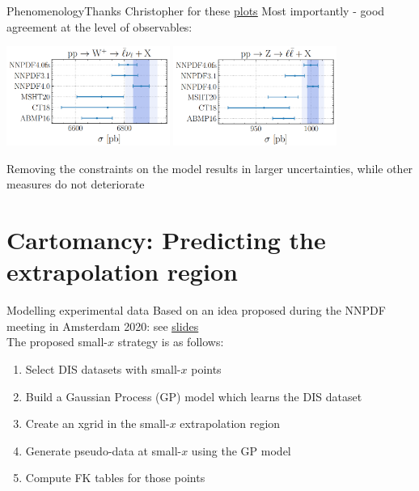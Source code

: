 \documentclass[aspectratio=169,11pt]{beamer}
\newcommand{\nn}{\vspace*{1em}}
\begin{document}
\begin{frame}[t]{Phenomenology}{Thanks Christopher for these {\color{blue} \underline{\href{https://vp.nnpdf.science/de96i8VBQ9Gc-zxl75AMfw==/pheno_featurescaling.pdf}{plots}}}}
  Most importantly - good agreement at the level of observables:
  \begin{center}
    \includegraphics[width=0.4\textwidth]{figures/pheno_w.png} \hfill
    \includegraphics[width=0.4\textwidth]{figures/pheno_z.png}
  \end{center}
  Removing the constraints on the model results in larger uncertainties, while other measures do not deteriorate
\end{frame}



\section{Cartomancy: Predicting the extrapolation region}


\begin{frame}[t]{Modelling experimental data}
  Based on an idea proposed during the NNPDF meeting in Amsterdam 2020: see 
  {\color{blue} \underline{\href{https://www.wiki.ed.ac.uk/download/attachments/432523942/carrazza.pdf?version=1&modificationDate=1581344104000&api=v2}{slides}}} \\ \nn
  The proposed small-$x$ strategy is as follows:
  \begin{enumerate}
    \item Select DIS datasets with small-$x$ points
    \item Build a Gaussian Process (GP) model which learns the DIS dataset
    \item Create an xgrid in the small-$x$ extrapolation region
    \item Generate pseudo-data at small-$x$ using the GP model
    \item Compute FK tables for those points
  \end{enumerate} 
\end{frame}
\end{document}
